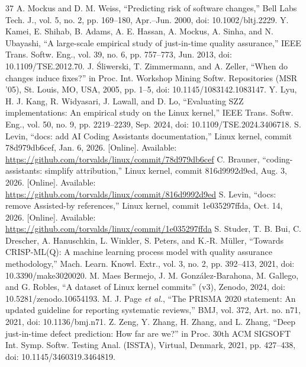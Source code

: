 \begin{thebibliography}{37}
 A. Mockus and D. M. Weiss, ``Predicting risk of software changes,'' Bell Labs Tech. J., vol. 5, no. 2, pp. 169--180, Apr.--Jun. 2000, doi: \mbox{10.1002/bltj.2229}.
 Y. Kamei, E. Shihab, B. Adams, A. E. Hassan, A. Mockus, A. Sinha, and N. Ubayashi, ``A large-scale empirical study of just-in-time quality assurance,'' IEEE Trans. Softw. Eng., vol. 39, no. 6, pp. 757--773, Jun. 2013, doi: \mbox{10.1109/TSE.2012.70}.
 J. Śliwerski, T. Zimmermann, and A. Zeller, ``When do changes induce fixes?'' in Proc. Int. Workshop Mining Softw. Repositories (MSR '05), St. Louis, MO, USA, 2005, pp. 1--5, doi: \mbox{10.1145/1083142.1083147}.
 Y. Lyu, H. J. Kang, R. Widyasari, J. Lawall, and D. Lo, ``Evaluating SZZ implementations: An empirical study on the Linux kernel,'' IEEE Trans. Softw. Eng., vol. 50, no. 9, pp. 2219--2239, Sep. 2024, doi: \mbox{10.1109/TSE.2024.3406718}.
 S. Levin, ``docs: add AI Coding Assistants documentation,'' Linux kernel, commit 78d979db6cef, Jan. 6, 2026. [Online]. Available: \url{https://github.com/torvalds/linux/commit/78d979db6cef}
 C. Brauner, ``coding-assistants: simplify attribution,'' Linux kernel, commit 816d9992d9ed, Aug. 3, 2026. [Online]. Available: \url{https://github.com/torvalds/linux/commit/816d9992d9ed}
 S. Levin, ``docs: remove Assisted-by references,'' Linux kernel, commit 1e035297ffda, Oct. 14, 2026. [Online]. Available: \url{https://github.com/torvalds/linux/commit/1e035297ffda}
 S. Studer, T. B. Bui, C. Drescher, A. Hanuschkin, L. Winkler, S. Peters, and K.-R. M\"uller, ``Towards CRISP-ML(Q): A machine learning process model with quality assurance methodology,'' Mach. Learn. Knowl. Extr., vol. 3, no. 2, pp. 392--413, 2021, doi: 10.3390/make3020020.
 M. Maes Bermejo, J. M. González-Barahona, M. Gallego, and G. Robles, ``A dataset of Linux kernel commits'' (v3), Zenodo, 2024, doi: 10.5281/zenodo.10654193.
 M. J. Page \emph{et al.}, ``The PRISMA 2020 statement: An updated guideline for reporting systematic reviews,'' BMJ, vol. 372, Art. no. n71, 2021, doi: 10.1136/bmj.n71.
 Z. Zeng, Y. Zhang, H. Zhang, and L. Zhang, ``Deep just-in-time defect prediction: How far are we?'' in Proc. 30th ACM SIGSOFT Int. Symp. Softw. Testing Anal. (ISSTA), Virtual, Denmark, 2021, pp. 427--438, doi: \mbox{10.1145/3460319.3464819}.

\end{thebibliography}
